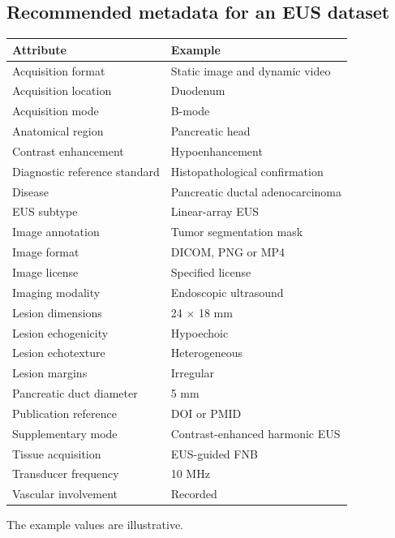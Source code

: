 \subsection{Recommended metadata for an EUS dataset}
\begin{longtable}{@{}p{}p{}@{}}
\toprule
\textbf{Attribute} & \textbf{Example} \\
\midrule
Acquisition format & Static image and dynamic video \\
Acquisition location & Duodenum \\
Acquisition mode & B-mode \\
Anatomical region & Pancreatic head \\
Contrast enhancement & Hypoenhancement \\
Diagnostic reference standard & Histopathological confirmation \\
Disease & Pancreatic ductal adenocarcinoma \\
EUS subtype & Linear-array EUS \\
Image annotation & Tumor segmentation mask \\
Image format & DICOM, PNG or MP4 \\
Image license & Specified license \\
Imaging modality & Endoscopic ultrasound \\
Lesion dimensions & 24 $\times$ 18 mm \\
Lesion echogenicity & Hypoechoic \\
Lesion echotexture & Heterogeneous \\
Lesion margins & Irregular \\
Pancreatic duct diameter & 5 mm \\
Publication reference & DOI or PMID \\
Supplementary mode & Contrast-enhanced harmonic EUS \\
Tissue acquisition & EUS-guided FNB \\
Transducer frequency & 10 MHz \\
Vascular involvement & Recorded \\
\bottomrule
\end{longtable}
The example values are illustrative.

